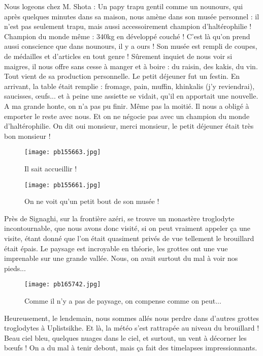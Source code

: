 \documentclass{book}
\begin{document}
Nous logeons chez M. Shota : Un papy trapu gentil comme un nounours, qui après quelques minutes dans sa maison, nous amène dans son musée personnel : il n'est pas seulement trapu, mais aussi accessoirement champion d'haltérophilie ! Champion du monde même : 340kg en développé couché ! C'est là qu'on prend aussi conscience que dans nounours, il y a ours ! Son musée est rempli de coupes, de médailles et d'articles en tout genre ! Sûrement inquiet de nous voir si maigres, il nous offre sans cesse à manger et à boire : du raisin, des kakis, du vin. Tout vient de sa production personnelle. Le petit déjeuner fut un festin. En arrivant, la table était remplie : fromage, pain, muffin, khinkalis (j'y reviendrai), saucisses, œufs... et à peine une assiette se vidait, qu'il en apportait une nouvelle. A ma grande honte, on n'a pas pu finir. Même pas la moitié. Il nous a obligé à emporter le reste avec nous. Et on ne négocie pas avec un champion du monde d'haltérophilie. On dit oui monsieur, merci monsieur, le petit déjeuner était très bon monsieur !




\begin{figure}[h]
\centering
\texttt{[image: pb155663.jpg]}
\caption*{Il sait accueillir !}
\end{figure}


\begin{figure}[h]
\centering
\texttt{[image: pb155661.jpg]}
\caption*{On ne voit qu'un petit bout de son musée !}
\end{figure}

Près de Signaghi, sur la frontière azéri, se trouve un monastère troglodyte incontournable, que nous avons donc visité, si on peut vraiment appeler ça une visite, étant donné que l'on était quasiment privés de vue tellement le brouillard était épais. Le paysage est incroyable en théorie, les grottes ont une vue imprenable sur une grande vallée. Nous, on avait surtout du mal à voir nos pieds...




\begin{figure}[h]
\centering
\texttt{[image: pb165742.jpg]}
\caption*{Comme il n'y a pas de paysage, on compense comme on peut...}
\end{figure}

Heureusement, le lendemain, nous sommes allés nous perdre dans d'autres grottes troglodytes à Uplistsikhe. Et là, la météo s'est rattrapée au niveau du brouillard ! Beau ciel bleu, quelques nuages dans le ciel, et surtout, un vent à décorner les bœufs ! On a du mal à tenir debout, mais ça fait des timelapses impressionnants.
\end{document}

